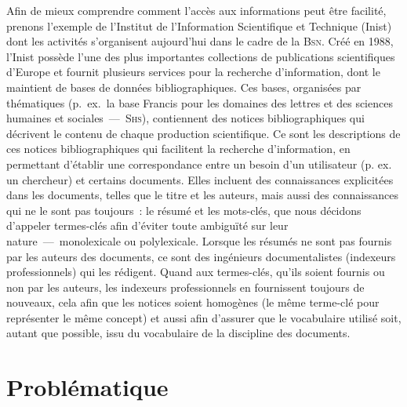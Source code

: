       Afin de mieux comprendre comment l'accès aux informations peut être
      facilité, prenons l'exemple de l'Institut de l'Information Scientifique et
      Technique (Inist) dont les activités s'organisent aujourd'hui dans le
      cadre de la \textsc{Bsn}. Créé en 1988, l'Inist possède l'une des plus
      importantes collections de publications scientifiques d'Europe et fournit
      plusieurs services pour la recherche d'information, dont le maintient de
      bases de données bibliographiques. Ces bases, organisées par thématiques
      (p.~ex.~la base Francis pour les domaines des lettres et des sciences
      humaines et sociales~---~\textsc{Shs}), contiennent des notices
      bibliographiques qui décrivent le contenu de chaque production
      scientifique. Ce sont les descriptions de ces notices bibliographiques qui
      facilitent la recherche d'information, en permettant d'établir une
      correspondance entre un besoin d'un utilisateur (p. ex. un chercheur) et
      certains documents. Elles incluent des connaissances explicitées dans les
      documents, telles que le titre et les auteurs, mais aussi des
      connaissances qui ne le sont pas toujours~: le résumé et les mots-clés,
      que nous décidons d'appeler termes-clés afin d'éviter toute ambiguïté sur
      leur nature~---~monolexicale ou polylexicale. Lorsque les résumés ne sont
      pas fournis par les auteurs des documents, ce sont des ingénieurs
      documentalistes (indexeurs professionnels) qui les rédigent. Quand aux
      termes-clés, qu'ils soient fournis ou non par les auteurs, les indexeurs
      professionnels en fournissent toujours de nouveaux, cela afin que les
      notices soient homogènes (le même terme-clé pour représenter le même
      concept) et aussi afin d'assurer que le vocabulaire utilisé soit, autant
      que possible, issu du vocabulaire de la discipline des documents.




    \section{Problématique}

